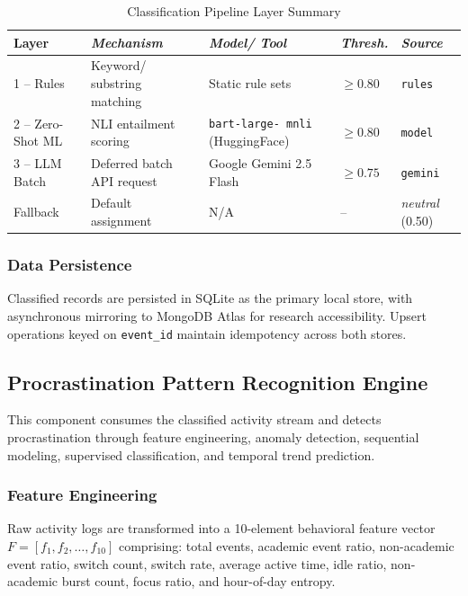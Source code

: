 \documentclass[conference]{IEEEtran}
\begin{document}
\begin{table}[htbp]
\caption{Classification Pipeline Layer Summary}
\label{tab_classification}
\begin{center}
\footnotesize
\begin{tabular}{|p{1.1cm}|p{1.5cm}|p{1.8cm}|p{0.7cm}|p{0.8cm}|}
\hline
\textbf{Layer} & \textbf{\textit{Mechanism}} & \textbf{\textit{Model/ Tool}} & \textbf{\textit{Thresh.}} & \textbf{\textit{Source}} \\
\hline
1 -- Rules & Keyword/ substring matching & Static rule sets & $\geq 0.80$ & \texttt{rules} \\
\hline
2 -- Zero-Shot ML & NLI entailment scoring & \texttt{bart-large- mnli} (HuggingFace) & $\geq 0.80$ & \texttt{model} \\
\hline
3 -- LLM Batch & Deferred batch API request & Google Gemini 2.5 Flash & $\geq 0.75$ & \texttt{gemini} \\
\hline
Fallback & Default assignment & N/A & -- & \textit{neutral} (0.50) \\
\hline
\end{tabular}
\end{center}
\end{table}

\subsubsection{Data Persistence}
Classified records are persisted in SQLite as the primary local store, with asynchronous mirroring to MongoDB Atlas for research accessibility. Upsert operations keyed on \texttt{event\_id} maintain idempotency across both stores.

\subsection{Procrastination Pattern Recognition Engine}
This component consumes the classified activity stream and detects procrastination through feature engineering, anomaly detection, sequential modeling, supervised classification, and temporal trend prediction.

\subsubsection{Feature Engineering}
Raw activity logs are transformed into a 10-element behavioral feature vector $F = [f_1, f_2, \ldots, f_{10}]$ comprising: total events, academic event ratio, non-academic event ratio, switch count, switch rate, average active time, idle ratio, non-academic burst count, focus ratio, and hour-of-day entropy.
\end{document}
